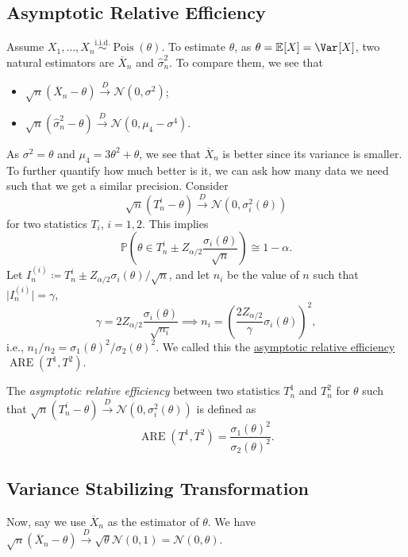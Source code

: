 \subsection{Asymptotic Relative Efficiency}
Assume \(X_1, \dots , X_n \overset{\text{i.i.d.} }{\sim } \operatorname{Pois}(\theta ) \). To estimate \(\theta \), as \(\theta = \mathbb{E}_{}[X] = \Var_{}[X] \), two natural estimators are \(\overline{X} _n\) and \(\hat{\sigma} _n^2\). To compare them, we see that
\begin{itemize}
	\item \(\sqrt{n} (\overline{X} _n - \theta ) \overset{D}{\to} \mathcal{N} (0, \sigma ^2)\);
	\item \(\sqrt{n} (\hat{\sigma} _n^2 - \theta ) \overset{D}{\to} \mathcal{N} (0, \mu _4 - \sigma ^4)\).
\end{itemize}
As \(\sigma ^2 = \theta \) and \(\mu _4 = 3 \theta ^2 + \theta \), we see that \(\overline{X} _n\) is better since its variance is smaller. To further quantify how much better is it, we can ask how many data we need such that we get a similar precision. Consider
\[
	\sqrt{n} (T_n^i - \theta )
	\overset{D}{\to} \mathcal{N} (0, \sigma _i^2(\theta ))
\]
for two statistics \(T_i\), \(i = 1, 2\). This implies
\[
	\mathbb{P} \left( \theta \in T_n^i \pm Z_{\alpha / 2} \frac{\sigma _i(\theta )}{\sqrt{n} } \right) \cong 1 - \alpha .
\]
Let \(I_n^{(i)} \coloneqq T_n^i \pm Z_{\alpha / 2} \sigma _i(\theta ) / \sqrt{n} \), and let \(n_i\) be the value of \(n\) such that \(\vert I_n^{(i)} \vert = \gamma \),
\[
	\gamma = 2 Z_{\alpha / 2} \frac{\sigma _i(\theta )}{\sqrt{n_i} }
	\implies n_i = \left( \frac{2 Z_{\alpha / 2}}{\gamma } \sigma _i(\theta ) \right)^2 ,
\]
i.e., \(n_1 / n_2 = \sigma _1(\theta )^2 / \sigma _2(\theta )^2\). We called this the \hyperref[def:asymptotic-relative-efficiency]{asymptotic relative efficiency} \(\operatorname{ARE}(T^1, T^2) \).

\begin{definition}\label{def:asymptotic-relative-efficiency}
	The \emph{asymptotic relative efficiency} between two statistics \(T^1_n\) and \(T^2_n\) for \(\theta \) such that \(\sqrt{n} (T_n^i - \theta ) \overset{D}{\to} \mathcal{N} (0, \sigma _i^2(\theta ))\) is defined as
	\[
		\operatorname{ARE}(T^1, T^2) = \frac{\sigma _1(\theta )^2}{\sigma _2(\theta )^2}.
	\]
\end{definition}

\subsection{Variance Stabilizing Transformation}
Now, say we use \(\overline{X} _n\) as the estimator of \(\theta \). We have \(\sqrt{n} (\overline{X} _n - \theta ) \overset{D}{\to} \sqrt{\theta } \mathcal{N} (0, 1) = \mathcal{N} (0, \theta )\).

